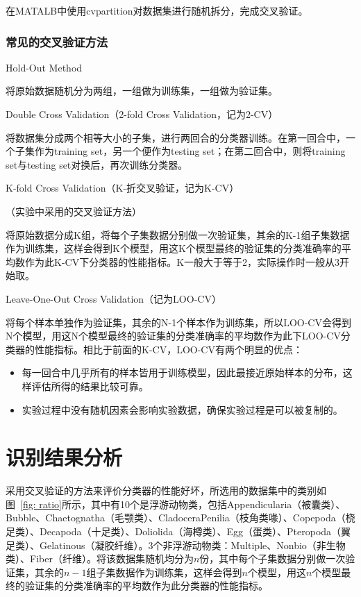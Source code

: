 \documentclass[12pt]{article}
\begin{document}
        在MATALB中使用cvpartition对数据集进行随机拆分，完成交叉验证。
        
\subsubsection{常见的交叉验证方法}

\begin{itemize}
    \item Hold-Out Method
    
    将原始数据随机分为两组，一组做为训练集，一组做为验证集。
    \item Double Cross Validation（2-fold Cross Validation，记为2-CV）
    
    将数据集分成两个相等大小的子集，进行两回合的分类器训练。在第一回合中，一个子集作为training set，另一个便作为testing set；在第二回合中，则将training set与testing set对换后，再次训练分类器。
    {\color{blue}\item K-fold Cross Validation（K-折交叉验证，记为K-CV）}（实验中采用的交叉验证方法）
    
    将原始数据分成K组，将每个子集数据分别做一次验证集，其余的K-1组子集数据作为训练集，这样会得到K个模型，用这K个模型最终的验证集的分类准确率的平均数作为此K-CV下分类器的性能指标。K一般大于等于2，实际操作时一般从3开始取。
    \item Leave-One-Out Cross Validation（记为LOO-CV）
    
    将每个样本单独作为验证集，其余的N-1个样本作为训练集，所以LOO-CV会得到N个模型，用这N个模型最终的验证集的分类准确率的平均数作为此下LOO-CV分类器的性能指标。相比于前面的K-CV，LOO-CV有两个明显的优点：
    \begin{itemize}
        \item 每一回合中几乎所有的样本皆用于训练模型，因此最接近原始样本的分布，这样评估所得的结果比较可靠。
        \item 实验过程中没有随机因素会影响实验数据，确保实验过程是可以被复制的。
    \end{itemize}
\end{itemize}

\section{识别结果分析}

采用交叉验证的方法来评价分类器的性能好坏，所选用的数据集中的类别如图~\ref{fig: ratio}所示，其中有10个是浮游动物类，包括Appendicularia（被囊类）、Bubble、Chaetognatha（毛颚类）、CladoceraPenilia（枝角类喙）、Copepoda（桡足类）、Decapoda（十足类）、Doliolida（海樽类）、Egg（蛋类）、Pteropoda（翼足类）、Gelatinous（凝胶纤维）。3个非浮游动物类：Multiple、Nonbio（非生物类）、Fiber（纤维）。将该数据集随机均分为$n$份，其中每个子集数据分别做一次验证集，其余的$n-1$组子集数据作为训练集，这样会得到$n$个模型，用这$n$个模型最终的验证集的分类准确率的平均数作为此分类器的性能指标。
\end{document}

